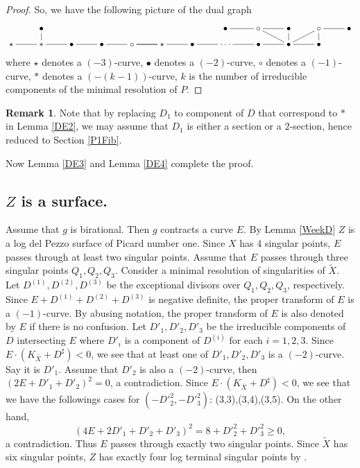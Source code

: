 \documentclass[10pt,oneside,reqno]{amsart}
\theoremstyle{definition}
\newtheorem{remark}[theorem]{Remark}
\theoremstyle{remark}
\numberwithin{equation}{section}
\begin{document}
\begin{proof}
So, we have the following picture of the dual graph $$
\xymatrix@R=0.8em{
&\bullet&&&&&&\bullet\ar@{-}[r]&\circ\ar@{-}[r]\ar@{-}[rd]&\bullet&\circ\ar@{-}[r]&\bullet\\
\star\ar@{-}[r]&\ast\ar@{-}[u]\ar@{-}[r]&\bullet\ar@{-}[r]&\bullet\ar@{-}[r]&\circ\ar@{-}[r]\ar@{-}[r]&\star\ar@{-}[r]&\bullet\ar@{-}[r]&\cdots\ar@{-}[r]&\bullet\ar@{-}[r]&\bullet\ar@{-}[r]\ar@{-}[u]\ar@{-}[ru]&\bullet\ar@{-}[u]
}
$$  where $\star$ denotes a $(-3)$-curve, $\bullet$ denotes a $(-2)$-curve, $\circ$ denotes a $(-1)$-curve, $\ast$ denotes a $(-(k-1))$-curve, $k$ is the number of irreducible components of the minimal resolution of $P$.
\end{proof}

\begin{remark}
Note that by replacing $D_1$ to component of $D$ that correspond to $\ast$ in Lemma \ref{DE2}, we may assume that $D_1$ is either a section or a $2$-section, hence reduced to  Section \ref{P1Fib}.
\end{remark}

Now Lemma \ref{DE3} and Lemma \ref{DE4} complete the proof.


\subsection{$Z$ is a surface.} Assume that $g$ is birational. Then $g$ contracts a curve $E$. By Lemma \ref{WeekD} $Z$ is a log del Pezzo surface of Picard number one. Since $X$ has $4$ singular points, $E$ passes through at least two singular points. Assume that $E$ passes through three singular points $Q_1, Q_2, Q_3$. Consider a minimal resolution of singularities of $\tilde{X}$. Let $D^{(1)}, D^{(2)}, D^{(3)}$ be the exceptional divisors over $Q_1, Q_2, Q_3$, respectively. Since $E+D^{(1)}+D^{(2)}+D^{(3)}$ is negative definite, the proper transform of $E$ is a $(-1)$-curve. By abusing notation, the proper transform of $E$ is also denoted by $E$ if there is no confusion. Let $D'_1,D'_2,D'_3$ be the irreducible components of $D$ intersecting $E$ where $D'_i$ is a component of $D^{(i)}$ for each $i=1,2,3.$ Since $E\cdot(K_{\bar{X}}+D^{\sharp})<0$, we see that at least one of $D'_1,D'_2,D'_3$ is a $(-2)$-curve. Say it is $D'_1$. Assume that $D'_2$ is also a $(-2)$-curve, then $(2E+D'_1+D'_2)^2=0$, a contradiction. Since $E\cdot(K_{\bar{X}}+D^{\sharp})<0$, we see that we have the followings cases for $(-D'^2_2,-D'^2_3)$: (3,3),(3,4),(3,5). On the other hand, $$(4E+2D'_1+D'_2+D'_3)^2=8+D'^2_2+D'^2_3\geq 0,$$
a contradiction. Thus $E$ passes through exactly two singular points. Since $\tilde{X}$ has six singular points, $Z$ has exactly four log terminal singular points by \cite{Bel1}.
\end{document}
